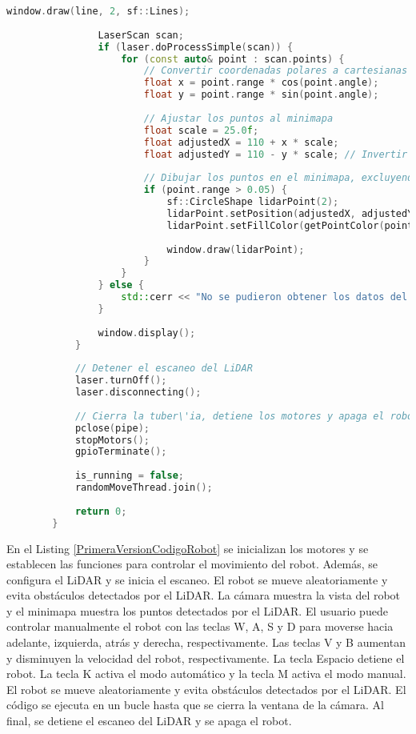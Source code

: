 \begin{lstlisting}[language={C++}, caption={Primera versi\'on del c\'odigo del sistema de control del robot}, label={PrimeraVersionCodigoRobot}]
                window.draw(line, 2, sf::Lines);
        
                LaserScan scan;
                if (laser.doProcessSimple(scan)) {
                    for (const auto& point : scan.points) {
                        // Convertir coordenadas polares a cartesianas
                        float x = point.range * cos(point.angle);
                        float y = point.range * sin(point.angle);
        
                        // Ajustar los puntos al minimapa
                        float scale = 25.0f;
                        float adjustedX = 110 + x * scale;
                        float adjustedY = 110 - y * scale; // Invertir Y para coordinar con la pantalla
        
                        // Dibujar los puntos en el minimapa, excluyendo el centro (0,0)
                        if (point.range > 0.05) {
                            sf::CircleShape lidarPoint(2);
                            lidarPoint.setPosition(adjustedX, adjustedY);
                            lidarPoint.setFillColor(getPointColor(point.range, max_range));
        
                            window.draw(lidarPoint);
                        }
                    }
                } else {
                    std::cerr << "No se pudieron obtener los datos del LiDAR." << std::endl;
                }
        
                window.display();
            }
        
            // Detener el escaneo del LiDAR
            laser.turnOff();
            laser.disconnecting();
        
            // Cierra la tuber\'ia, detiene los motores y apaga el robot
            pclose(pipe);
            stopMotors();
            gpioTerminate();
        
            is_running = false;
            randomMoveThread.join();
        
            return 0;
        }
    \end{lstlisting}

    En el Listing \ref{PrimeraVersionCodigoRobot} se inicializan los motores y se establecen las funciones para controlar el movimiento del robot. 
        Adem\'as, se configura el LiDAR y se inicia el escaneo. El robot se mueve aleatoriamente y evita obst\'aculos 
        detectados por el LiDAR. La c\'amara muestra la vista del robot y el minimapa muestra los puntos detectados por 
        el LiDAR. El usuario puede controlar manualmente el robot con las teclas W, A, S y D para moverse hacia adelante, 
        izquierda, atr\'as y derecha, respectivamente. Las teclas V y B aumentan y disminuyen la velocidad del robot, 
        respectivamente. La tecla Espacio detiene el robot. La tecla K activa el modo autom\'atico y la tecla M activa 
        el modo manual. El robot se mueve aleatoriamente y evita obst\'aculos detectados por el LiDAR. El c\'odigo se ejecuta 
        en un bucle hasta que se cierra la ventana de la c\'amara. Al final, se detiene el escaneo del LiDAR y se apaga el robot.
    